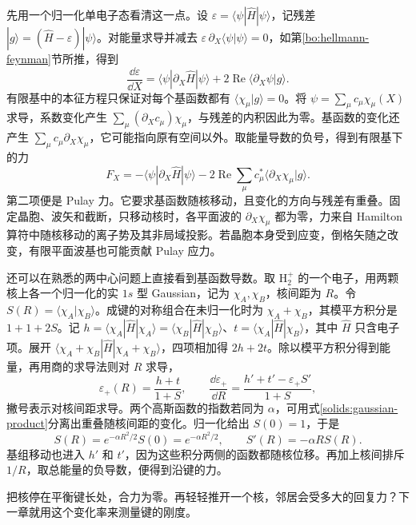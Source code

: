 先用一个归一化单电子态看清这一点。设 $\varepsilon=\langle\psi|\hat H|\psi\rangle$，记残差 $|g\rangle=(\hat H-\varepsilon)|\psi\rangle$。对能量求导并减去 $\varepsilon\,\partial_X\langle\psi|\psi\rangle=0$，如第\ref{bo:hellmann-feynman}节所推，得到
\[
 \frac{\dd\varepsilon}{\dd X}=
 \langle\psi|\partial_X\hat H|\psi\rangle+
 2\operatorname{Re}\langle\partial_X\psi|g\rangle .
\]
有限基中的本征方程只保证对每个基函数都有 $\langle\chi_\mu|g\rangle=0$。将 $\psi=\sum_\mu c_\mu\chi_\mu(X)$ 求导，系数变化产生 $\sum_\mu(\partial_Xc_\mu)\chi_\mu$，与残差的内积因此为零。基函数的变化还产生 $\sum_\mu c_\mu\partial_X\chi_\mu$，它可能指向原有空间以外。取能量导数的负号，得到有限基下的力
\begin{equation}\label{solids:pulay-residual}
 F_X=-\langle\psi|\partial_X\hat H|\psi\rangle
     -2\operatorname{Re}\sum_\mu c_\mu^*
             \langle\partial_X\chi_\mu|g\rangle .
\end{equation}
第二项便是 Pulay 力。它要求基函数随核移动，且变化的方向与残差有重叠。固定晶胞、波矢和截断，只移动核时，各平面波的 $\partial_X\chi_\mu$ 都为零，力来自 Hamilton 算符中随核移动的离子势及其非局域投影。若晶胞本身受到应变，倒格矢随之改变，有限平面波基也可能贡献 Pulay 应力。

还可以在熟悉的两中心问题上直接看到基函数导数。取 $\mathrm H_2^+$ 的一个电子，用两颗核上各一个归一化的实 $1s$ 型 Gaussian，记为 $\chi_A,\chi_B$，核间距为 $R$。令 $S(R)=\langle\chi_A|\chi_B\rangle$。成键的对称组合在未归一化时为 $\chi_A+\chi_B$，其模平方积分是 $1+1+2S$。记 $h=\langle\chi_A|\hat H|\chi_A\rangle=\langle\chi_B|\hat H|\chi_B\rangle$、$t=\langle\chi_A|\hat H|\chi_B\rangle$，其中 $\hat H$ 只含电子项。展开 $\langle\chi_A+\chi_B|\hat H|\chi_A+\chi_B\rangle$，四项相加得 $2h+2t$。除以模平方积分得到能量，再用商的求导法则对 $R$ 求导，
\begin{equation}
 \varepsilon_+(R)=\frac{h+t}{1+S},\qquad
 \frac{\dd\varepsilon_+}{\dd R}=
 \frac{h'+t'-\varepsilon_+ S'}{1+S},
\end{equation}
撇号表示对核间距求导。两个高斯函数的指数若同为 $\alpha$，可用式\eqref{solids:gaussian-product}分离出重叠随核间距的变化。归一化给出 $S(0)=1$，于是
\[
 S(R)=e^{-\alpha R^2/2}S(0)=e^{-\alpha R^2/2},\qquad S'(R)=-\alpha R S(R).
\]
基组移动也进入 $h'$ 和 $t'$，因为这些积分两侧的函数都随核位移。再加上核间排斥 $1/R$，取总能量的负导数，便得到沿键的力。

把核停在平衡键长处，合力为零。再轻轻推开一个核，邻居会受多大的回复力？下一章就用这个变化率来测量键的刚度。
